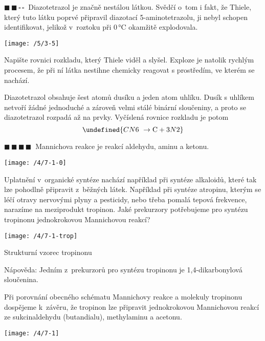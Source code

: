 \documentclass{book}
\let\ch\undefined
\newcommand{\dva}{$\blacksquare \, \blacksquare \, \square \, \square \; \; $}
\newcommand{\ctyri}{$\blacksquare \, \blacksquare \, \blacksquare \, \blacksquare \; \; $}
\renewenvironment{quotation}{\par}{\par} %
\begin{document}
\begin{quotation}
\dva Diazotetrazol je značně nestálou látkou. Svědčí o~tom i fakt, že
Thiele, který tuto látku poprvé připravil diazotací 5-aminotetrazolu,
ji nebyl schopen identifikovat, jelikož v~roztoku při 0\,°C okamžitě
explodovala. 
\begin{center}
\texttt{[image: /5/3-5]} 
\par\end{center}
Napište rovnici rozkladu, který Thiele viděl a slyšel. Exploze je
natolik rychlým procesem, že při ní látka nestihne chemicky reagovat
s prostředím, ve kterém se nachází.
\end{quotation} \dotfill \par 
Diazotetrazol obsahuje šest atomů dusíku a jeden atom uhlíku. Dusík
s uhlíkem netvoří žádné jednoduché a zároveň velmi stálé binární sloučeniny,
a proto se diazotetrazol rozpadá až na prvky. Vyčíslená rovnice rozkladu
je potom 
\[
\ch{CN6 \ \rightarrow \mathrm{C} + 3 N2}
\]

\hrulefill %
\begin{quotation}
\ctyri Mannichova reakce je reakcí aldehydu, aminu a ketonu. 
\begin{center}

\texttt{[image: /4/7-1-0]}

\par\end{center}
Uplatnění v~organické syntéze nachází například při syntéze alkaloidů,
které tak lze pohodlně připravit z~běžných látek. Například při syntéze
atropinu, kterým se léčí otravy nervovými plyny a pesticidy, nebo
třeba pomalá tepová frekvence, narazíme na meziprodukt tropinon. Jaké
prekurzory potřebujeme pro syntézu tropinonu jednokrokovou Mannichovou
reakcí? 
\begin{center}

\noindent \begin{centering}
\texttt{[image: /4/7-1-trop]}
\par\end{centering}
Strukturní vzorec tropinonu

\par\end{center}
Nápověda: Jedním z~prekurzorů pro syntézu tropinonu je 1,4-dikarbonylová
sloučenina.
\end{quotation} \dotfill \par 
Při porovnání obecného schématu Mannichovy reakce a molekuly tropinonu
dospějeme k~závěru, že tropinon lze připravit jednokrokovou Mannichovou
reakcí ze sukcinaldehydu (butandialu), methylaminu a acetonu. 
\noindent \begin{center}

\texttt{[image: /4/7-1]}

\par\end{center}
\end{document}
